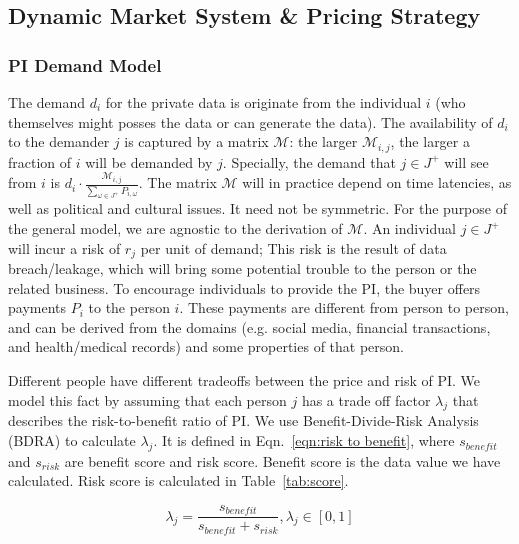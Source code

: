 \documentclass{mcmthesis}
\begin{document}
\subsection{Dynamic Market System \& Pricing Strategy}
\subsubsection{PI Demand Model}
The demand $d_i$ for the private data is originate from the individual $i$ (who themselves might posses the data or can generate the data). The availability of $d_i$ to the demander $j$ is captured by a matrix $\mathcal{M}$: the larger $\mathcal{M}_{i,j}$, the larger a fraction of $i$ will be demanded by $j$. Specially, the demand that $j\in J^+$ will see from $i$ is $d_i\cdot\frac{\mathcal{M}_{i,j}}{\sum_{\omega\in J^+}P_{i,\omega}}$. The matrix $\mathcal{M}$ will in practice depend on time latencies, as well as political and cultural issues. It need not be symmetric. For the purpose of the general model, we are agnostic to the derivation of $\mathcal{M}$. An individual $j\in J^+$  will incur a risk of $r_j$ per unit of demand; This risk is the result of data breach/leakage, which will bring some potential trouble to the person or the related business.  To encourage individuals to provide the PI, the buyer offers payments $P_i$ to the person $i$. These payments are different from person to person, and can be derived from the domains (e.g. social media, financial transactions, and health/medical records) and some properties of that person.

Different people have different tradeoffs between the price and risk of PI. We model this fact by assuming that each person $j$ has a trade off factor $\lambda_j$ that describes the risk-to-benefit ratio of PI. We use Benefit-Divide-Risk Analysis (BDRA) to calculate $\lambda_j$. It is defined in Eqn.~\eqref{eqn:risk to benefit}, where $s_{benefit}$ and $s_{risk}$ are benefit score and risk score. Benefit score is the data value we have calculated. Risk score is calculated in Table~\ref{tab:score}. 

\begin{equation}\label{eqn:risk to benefit}
    \lambda_j=\frac{s_{benefit}}{s_{benefit}+s_{risk}},
   \lambda_j \in [0,1]
\end{equation}
\end{document}
